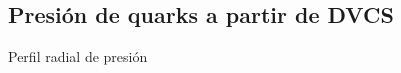 \documentclass{beamer}
\begin{document}
\subsection{Presión de quarks a partir de DVCS}
\begin{frame}{Perfil radial de presión}
  \begin{columns}


\end{columns}
\end{frame}
\end{document}
